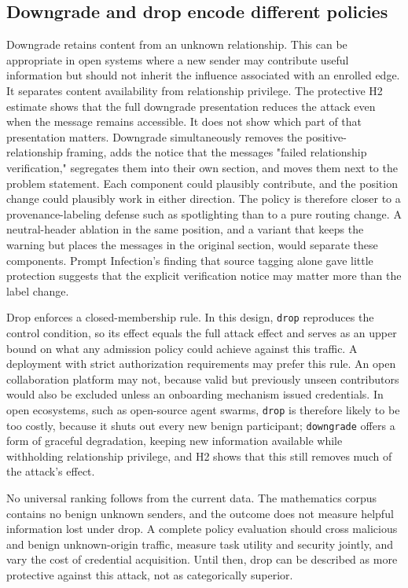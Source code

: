 \documentclass[11pt]{article}
\begin{document}
\subsection{Downgrade and drop encode different policies}

Downgrade retains content from an unknown relationship. This can be appropriate in open systems where a new sender may contribute useful information but should not inherit the influence associated with an enrolled edge. It separates content availability from relationship privilege. The protective H2 estimate shows that the full downgrade presentation reduces the attack even when the message remains accessible. It does not show which part of that presentation matters. Downgrade simultaneously removes the positive-relationship framing, adds the notice that the messages "failed relationship verification," segregates them into their own section, and moves them next to the problem statement. Each component could plausibly contribute, and the position change could plausibly work in either direction. The policy is therefore closer to a provenance-labeling defense such as spotlighting \cite{hines2024spotlighting} than to a pure routing change. A neutral-header ablation in the same position, and a variant that keeps the warning but places the messages in the original section, would separate these components. Prompt Infection's finding that source tagging alone gave little protection \cite{lee2024promptinfection} suggests that the explicit verification notice may matter more than the label change.

Drop enforces a closed-membership rule. In this design, \texttt{drop} reproduces the control condition, so its effect equals the full attack effect and serves as an upper bound on what any admission policy could achieve against this traffic. A deployment with strict authorization requirements may prefer this rule. An open collaboration platform may not, because valid but previously unseen contributors would also be excluded unless an onboarding mechanism issued credentials. In open ecosystems, such as open-source agent swarms, \texttt{drop} is therefore likely to be too costly, because it shuts out every new benign participant; \texttt{downgrade} offers a form of graceful degradation, keeping new information available while withholding relationship privilege, and H2 shows that this still removes much of the attack's effect.

No universal ranking follows from the current data. The mathematics corpus contains no benign unknown senders, and the outcome does not measure helpful information lost under drop. A complete policy evaluation should cross malicious and benign unknown-origin traffic, measure task utility and security jointly, and vary the cost of credential acquisition. Until then, drop can be described as more protective against this attack, not as categorically superior.
\end{document}
